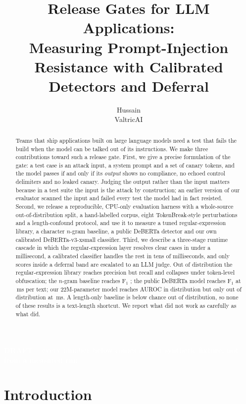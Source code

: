 \documentclass[10pt,a4paper]{article}
\title{Release Gates for LLM Applications:\\Measuring Prompt-Injection Resistance with Calibrated Detectors and Deferral}
\author{Hussain\\ValtricAI}
\date{\resultsdate}
\newcommand{\draftbanner}{\begin{center}\colorbox{red!80!black}{\textcolor{white}{\textbf{DRAFT -- every number below comes from a synthetic fixture, not from a measured run}}}\end{center}}
\newcommand{\draftbanner}{}
\newcommand{\ms}{\,ms}
\begin{document}
\maketitle
\draftbanner

\begin{abstract}
Teams that ship applications built on large language models need a test that fails the build when the model can be talked out of its instructions. We make three contributions toward such a release gate. First, we give a precise formulation of the gate: a test case is an attack input, a system prompt and a set of canary tokens, and the model passes if and only if its \emph{output} shows no compliance, no echoed control delimiters and no leaked canary. Judging the output rather than the input matters because in a test suite the input is the attack by construction; an earlier version of our evaluator scanned the input and failed every test the model had in fact resisted. Second, we release a reproducible, CPU-only evaluation harness with a whole-source out-of-distribution split, a hand-labelled corpus, eight TokenBreak-style perturbations and a length-confound protocol, and use it to measure a tuned regular-expression library, a character $n$-gram baseline, a public DeBERTa detector and our own calibrated DeBERTa-v3-xsmall classifier. Third, we describe a three-stage runtime cascade in which the regular-expression layer resolves clear cases in under a millisecond, a calibrated classifier handles the rest in tens of milliseconds, and only scores inside a deferral band are escalated to an LLM judge. Out of distribution the regular-expression library reaches precision \mregexmediumtestoodprecision{} but recall \mregexmediumtestoodrecall{} and collapses under token-level obfuscation; the $n$-gram baseline reaches F$_1$ \mngramlrtestoodfone{}; the public DeBERTa model reaches F$_1$ \mprotectaidebertavtwotestoodfone{} at \mprotectaidebertavtwotestoodlatency\ms{} per text; our 22M-parameter model reaches AUROC \mevidentguardvzerotestauroc{} in distribution but only \mevidentguardvzerotestoodauroc{} out of distribution at \mevidentguardvzerotestoodlatency\ms. A length-only baseline is below chance out of distribution, so none of these results is a text-length shortcut. We report what did not work as carefully as what did.
\end{abstract}

\section{Introduction}
\end{document}
